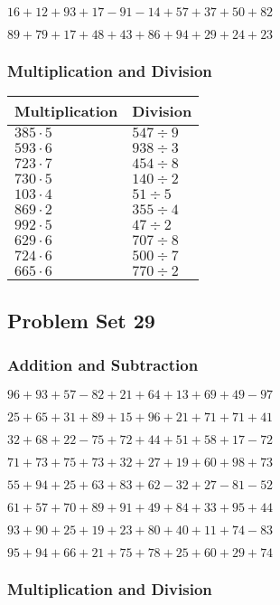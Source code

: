 \(16+12+93+17-91-14+57+37+50+82\)

\(89+79+17+48+43+86+94+29+24+23\)

\hypertarget{multiplication-and-division-27}{%
\subsubsection{Multiplication and
Division}\label{multiplication-and-division-27}}

\begin{longtable}[]{@{}ll@{}}
\toprule
Multiplication & Division\tabularnewline
\midrule
\endhead
\(385\cdot5\) & \(547÷9\)\tabularnewline
\(593\cdot6\) & \(938÷3\)\tabularnewline
\(723\cdot7\) & \(454÷8\)\tabularnewline
\(730\cdot5\) & \(140÷2\)\tabularnewline
\(103\cdot4\) & \(51÷5\)\tabularnewline
\(869\cdot2\) & \(355÷4\)\tabularnewline
\(992\cdot5\) & \(47÷2\)\tabularnewline
\(629\cdot6\) & \(707÷8\)\tabularnewline
\(724\cdot6\) & \(500÷7\)\tabularnewline
\(665\cdot6\) & \(770÷2\)\tabularnewline
\bottomrule
\end{longtable}

\hypertarget{problem-set-29}{%
\subsection{Problem Set 29}\label{problem-set-29}}

\hypertarget{addition-and-subtraction-28}{%
\subsubsection{Addition and
Subtraction}\label{addition-and-subtraction-28}}

\(96+93+57-82+21+64+13+69+49-97\)

\(25+65+31+89+15+96+21+71+71+41\)

\(32+68+22-75+72+44+51+58+17-72\)

\(71+73+75+73+32+27+19+60+98+73\)

\(55+94+25+63+83+62-32+27-81-52\)

\(61+57+70+89+91+49+84+33+95+44\)

\(93+90+25+19+23+80+40+11+74-83\)

\(95+94+66+21+75+78+25+60+29+74\)

\hypertarget{multiplication-and-division-28}{%
\subsubsection{Multiplication and
Division}\label{multiplication-and-division-28}}

